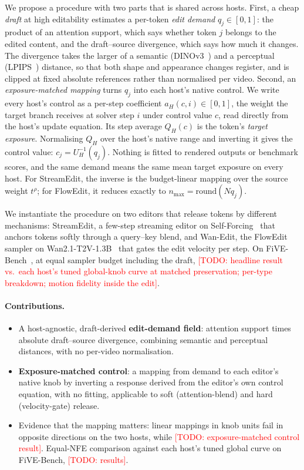 \documentclass[10pt,twocolumn]{article}
\newcommand{\todo}[1]{\textcolor{red}{[TODO: #1]}}
\begin{document}
We propose a procedure with two parts that is shared across hosts. First, a cheap \emph{draft} at high editability estimates a per-token \emph{edit demand} $q_j\in[0,1]$: the product of an attention support, which says whether token $j$ belongs to the edited content, and the draft--source divergence, which says how much it changes. The divergence takes the larger of a semantic (DINOv3~\cite{dino}) and a perceptual (LPIPS~\cite{lpips2018}) distance, so that both shape and appearance changes register, and is clipped at fixed absolute references rather than normalised per video. Second, an \emph{exposure-matched mapping} turns $q_j$ into each host's native control. We write every host's control as a per-step coefficient $a_H(c,i)\in[0,1]$, the weight the target branch receives at solver step $i$ under control value $c$, read directly from the host's update equation. Its step average $Q_H(c)$ is the token's \emph{target exposure}. Normalising $Q_H$ over the host's native range and inverting it gives the control value: $c_j=U_H^{-1}(q_j)$. Nothing is fitted to rendered outputs or benchmark scores, and the same demand means the same mean target exposure on every host. For StreamEdit, the inverse is the budget-linear mapping over the source weight $t^{\rho}$; for FlowEdit, it reduces exactly to $n_{\max}=\mathrm{round}(Nq_j)$.

We instantiate the procedure on two editors that release tokens by different mechanisms: StreamEdit, a few-step streaming editor on Self-Forcing~\cite{selfforcing2025} that anchors tokens softly through a query--key blend, and Wan-Edit, the FlowEdit~\cite{flowedit2025} sampler on Wan2.1-T2V-1.3B~\cite{wan2025} that gates the edit velocity per step. On FiVE-Bench~\cite{five2025}, at equal sampler budget including the draft, \todo{headline result vs.\ each host's tuned global-knob curve at matched preservation; per-type breakdown; motion fidelity inside the edit}.

\paragraph{Contributions.}
\begin{itemize}\setlength\itemsep{1pt}
\item A host-agnostic, draft-derived \textbf{edit-demand field}: attention support times absolute draft--source divergence, combining semantic and perceptual distances, with no per-video normalisation.
\item \textbf{Exposure-matched control}: a mapping from demand to each editor's native knob by inverting a response derived from the editor's own control equation, with no fitting, applicable to soft (attention-blend) and hard (velocity-gate) release.
\item Evidence that the mapping matters: linear mappings in knob units fail in opposite directions on the two hosts, while \todo{exposure-matched control result}. Equal-NFE comparison against each host's tuned global curve on FiVE-Bench, \todo{results}.
\end{itemize}
\end{document}
